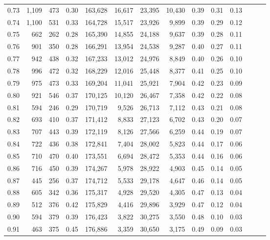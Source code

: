 \begin{tabular}{rrrrrrrrrrrrrr}
0.73 &  1,109 &  473 &  0.30 &  163,628 &   16,617 &  23,395 &  10,430 &  0.39 &  0.31 &      0.13 \\
0.74 &  1,100 &  531 &  0.33 &  164,728 &   15,517 &  23,926 &   9,899 &  0.39 &  0.29 &      0.12 \\
0.75 &    662 &  262 &  0.28 &  165,390 &   14,855 &  24,188 &   9,637 &  0.39 &  0.28 &      0.11 \\
0.76 &    901 &  350 &  0.28 &  166,291 &   13,954 &  24,538 &   9,287 &  0.40 &  0.27 &      0.11 \\
0.77 &    942 &  438 &  0.32 &  167,233 &   13,012 &  24,976 &   8,849 &  0.40 &  0.26 &      0.10 \\
0.78 &    996 &  472 &  0.32 &  168,229 &   12,016 &  25,448 &   8,377 &  0.41 &  0.25 &      0.10 \\
0.79 &    975 &  473 &  0.33 &  169,204 &   11,041 &  25,921 &   7,904 &  0.42 &  0.23 &      0.09 \\
0.80 &    921 &  546 &  0.37 &  170,125 &   10,120 &  26,467 &   7,358 &  0.42 &  0.22 &      0.08 \\
0.81 &    594 &  246 &  0.29 &  170,719 &    9,526 &  26,713 &   7,112 &  0.43 &  0.21 &      0.08 \\
0.82 &    693 &  410 &  0.37 &  171,412 &    8,833 &  27,123 &   6,702 &  0.43 &  0.20 &      0.07 \\
0.83 &    707 &  443 &  0.39 &  172,119 &    8,126 &  27,566 &   6,259 &  0.44 &  0.19 &      0.07 \\
0.84 &    722 &  436 &  0.38 &  172,841 &    7,404 &  28,002 &   5,823 &  0.44 &  0.17 &      0.06 \\
0.85 &    710 &  470 &  0.40 &  173,551 &    6,694 &  28,472 &   5,353 &  0.44 &  0.16 &      0.06 \\
0.86 &    716 &  450 &  0.39 &  174,267 &    5,978 &  28,922 &   4,903 &  0.45 &  0.14 &      0.05 \\
0.87 &    445 &  256 &  0.37 &  174,712 &    5,533 &  29,178 &   4,647 &  0.46 &  0.14 &      0.05 \\
0.88 &    605 &  342 &  0.36 &  175,317 &    4,928 &  29,520 &   4,305 &  0.47 &  0.13 &      0.04 \\
0.89 &    512 &  376 &  0.42 &  175,829 &    4,416 &  29,896 &   3,929 &  0.47 &  0.12 &      0.04 \\
0.90 &    594 &  379 &  0.39 &  176,423 &    3,822 &  30,275 &   3,550 &  0.48 &  0.10 &      0.03 \\
0.91 &    463 &  375 &  0.45 &  176,886 &    3,359 &  30,650 &   3,175 &  0.49 &  0.09 &      0.03 \\

\end{tabular}
